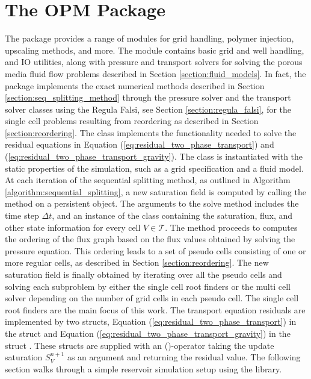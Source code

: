 \section{The OPM Package}
\label{section:opm_package}
The \opm package provides a range of modules for grid handling, polymer injection, upscaling methods, and more. The  module contains basic grid and well handling, and IO utilities, along with pressure and transport solvers for solving the porous media fluid flow problems described in Section \ref{section:fluid_models}. In fact, the \opm package implements the exact numerical methods described in Section \ref{section:seq_splitting_method} through the  pressure solver and the  transport solver classes using the Regula Falsi, see Section \ref{section:regula_falsi}, for the single cell problems resulting from  reordering as described in Section \ref{section:reordering}. The class  implements the functionality needed to solve the residual equations in Equation (\ref{eq:residual_two_phase_transport}) and (\ref{eq:residual_two_phase_transport_gravity}). The class is instantiated with the static properties of the simulation, such as a grid specification and a fluid model. At each iteration of the sequential splitting method, as outlined in Algorithm \ref{algorithm:sequential_splitting}, a new saturation field is computed by calling the method  on a persistent  object. The arguments to the solve method includes the time step $\Delta t$, and an instance of the class  containing the saturation, flux, and other state information for every cell $V \in \mathcal{T}$. The  method proceeds to computes the ordering of the flux graph based on the flux values obtained by solving the pressure equation. This ordering leads to a set of pseudo cells consisting of one or more regular cells, as described in Section \ref{section:reordering}. The new saturation field is finally obtained by iterating over all the pseudo cells and solving each subproblem by either the single cell root finders or the multi cell solver depending on the number of grid cells in each pseudo cell. The single cell root finders are the main focus of this work. The transport equation residuals are implemented by two structs, Equation (\ref{eq:residual_two_phase_transport}) in the struct  and Equation (\ref{eq:residual_two_phase_transport_gravity}) in the struct . These structs are supplied with an ()-operator taking the update saturation $S_V^{n+1}$ as an argument and returning the residual value. The following section walks through a simple reservoir simulation setup using the \opm library.

